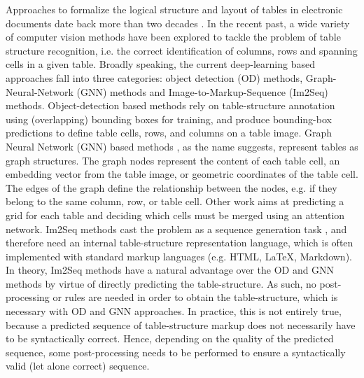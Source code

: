 \documentclass[runningheads]{llncs}
\begin{document}
Approaches to formalize the logical structure and layout of tables in electronic documents date back more than two decades \cite{10.5555/923400}. In the recent past, a wide variety of computer vision methods have been explored to tackle the problem of table structure recognition, i.e. the correct identification of columns, rows and spanning cells in a given table. Broadly speaking, the current deep-learning based approaches fall into three categories: object detection (OD) methods, Graph-Neural-Network (GNN) methods and Image-to-Markup-Sequence (Im2Seq) methods. Object-detection based methods \cite{prasad2020cascadetabnet,schreiber2017deepdesrt,8978137,smock2022pubtables,GTE} rely on table-structure annotation using (overlapping) bounding boxes for training, and produce bounding-box predictions to define table cells, rows, and columns on a table image. 
Graph Neural Network (GNN) based methods \cite{chi2019complicated,lee2022table,xue2019res2tim,xue2021tgrnet}, as the name suggests, represent tables as graph structures. The graph nodes represent the content of each table cell, an embedding vector from the table image, or geometric coordinates of the table cell. The edges of the graph define the relationship between the nodes, e.g. if they belong to the same column, row, or table cell. Other work \cite{zhang2022split} aims at predicting a grid for each table and deciding which cells must be merged using an attention network. 
Im2Seq methods cast the problem as a sequence generation task \cite{deng2019challenges,kayal2022tables,TableFormer,PubTabNet}, and therefore need an internal table-structure representation language, which is often implemented with standard markup languages (e.g. HTML, LaTeX, Markdown). 
In theory, Im2Seq methods have a natural advantage over the OD and GNN methods by virtue of directly predicting the table-structure. As such, no post-processing or rules are needed in order to obtain the table-structure, which is necessary with OD and GNN approaches. In practice, this is not entirely true, because a predicted sequence of table-structure markup does not necessarily have to be syntactically correct. Hence, depending on the quality of the predicted sequence, some post-processing needs to be performed to ensure a syntactically valid (let alone correct) sequence. 
\end{document}
